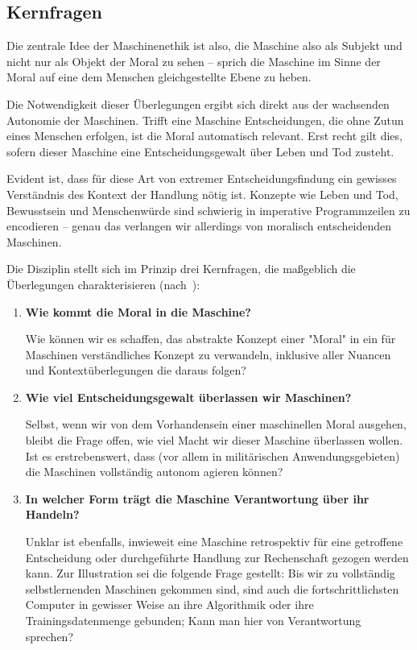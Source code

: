 \documentclass[twocolumn, german]{tum-article}
\begin{document}
\subsection{Kernfragen}
Die zentrale Idee der Maschinenethik ist also, die Maschine also als Subjekt und nicht nur als Objekt der Moral zu sehen -- sprich die Maschine im Sinne der Moral auf eine dem Menschen gleichgestellte Ebene zu heben.

Die Notwendigkeit dieser Überlegungen ergibt sich direkt aus der wachsenden Autonomie der Maschinen.
Trifft eine Maschine Entscheidungen, die ohne Zutun eines Menschen erfolgen, ist die Moral automatisch relevant.
Erst recht gilt dies, sofern dieser Maschine eine Entscheidungsgewalt über Leben und Tod zusteht.

Evident ist, dass für diese Art von extremer Entscheidungsfindung ein gewisses Verständnis des Kontext der Handlung nötig ist.
Konzepte wie Leben und Tod, Bewusstsein und Menschenwürde sind schwierig in imperative Programmzeilen zu encodieren -- genau das verlangen wir allerdings von moralisch entscheidenden Maschinen.

Die Disziplin stellt sich im Prinzip drei Kernfragen, die maßgeblich die Überlegungen charakterisieren (nach~\cite[S. 13ff.]{bendel-mascheth}):
\begin{enumerate}
	\item \textbf{Wie kommt die Moral in die Maschine?}

	Wie können wir es schaffen, das abstrakte Konzept einer "Moral" in ein für Maschinen verständliches Konzept zu verwandeln, inklusive aller Nuancen und Kontextüberlegungen die daraus folgen?
	
	\item \textbf{Wie viel Entscheidungsgewalt überlassen wir Maschinen?}

	Selbst, wenn wir von dem Vorhandensein einer maschinellen Moral ausgehen, bleibt die Frage offen, wie viel Macht wir dieser Maschine überlassen wollen.
	Ist es erstrebenswert, dass (vor allem in militärischen Anwendungsgebieten) die Maschinen vollständig autonom agieren können?
	
	\item \textbf{In welcher Form trägt die Maschine Verantwortung über ihr Handeln?}

	Unklar ist ebenfalls, inwieweit eine Maschine retrospektiv für eine getroffene Entscheidung oder durchgeführte Handlung zur Rechenschaft gezogen werden kann.
	Zur Illustration sei die folgende Frage gestellt: Bis wir zu vollständig selbstlernenden Maschinen gekommen sind, sind auch die fortschrittlichsten Computer in gewisser Weise an ihre Algorithmik oder ihre Trainingsdatenmenge gebunden; Kann man hier von Verantwortung sprechen?
\end{enumerate}
\end{document}
